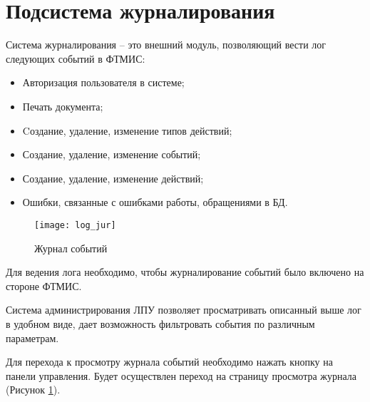 \newpage
\section{Подсистема журналирования}

Система журналирования – это внешний модуль, позволяющий вести лог следующих событий в ФТМИС:
\begin{itemize}
 \item Авторизация пользователя в системе;
 \item Печать документа;
 \item Cоздание, удаление, изменение типов действий;
 \item Создание, удаление, изменение событий;
 \item Создание, удаление, изменение действий;
 \item Ошибки, связанные с ошибками работы, обращениями в БД.
\end{itemize}

\begin{figure}[ht]\centering
 \texttt{[image: log\_jur]}
 \caption{Журнал событий}
 \label{img_log_jur}
\end{figure} 
 
Для ведения лога необходимо, чтобы журналирование событий было включено на стороне ФТМИС.

Система администрирования ЛПУ позволяет просматривать описанный выше лог в удобном виде, дает возможность фильтровать события по различным параметрам.

Для перехода к просмотру журнала событий необходимо нажать кнопку  на панели управления. Будет осуществлен переход на страницу просмотра журнала (Рисунок \ref{img_log_jur}).

